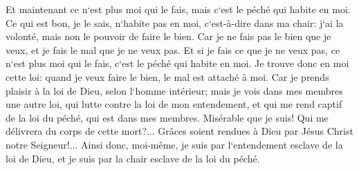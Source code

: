 \verse Et maintenant ce n`est plus moi qui le fais, mais c`est le péché qui habite en moi. 
\verse Ce qui est bon, je le sais, n`habite pas en moi, c`est-à-dire dans ma chair: j`ai la volonté, mais non le pouvoir de faire le bien. 
\verse Car je ne fais pas le bien que je veux, et je fais le mal que je ne veux pas. 
\verse Et si je fais ce que je ne veux pas, ce n`est plus moi qui le fais, c`est le péché qui habite en moi. 
\verse Je trouve donc en moi cette loi: quand je veux faire le bien, le mal est attaché à moi. 
\verse Car je prends plaisir à la loi de Dieu, selon l`homme intérieur; 
\verse mais je vois dans mes membres une autre loi, qui lutte contre la loi de mon entendement, et qui me rend captif de la loi du péché, qui est dans mes membres. 
\verse Misérable que je suis! Qui me délivrera du corps de cette mort?... 
\verse Grâces soient rendues à Dieu par Jésus Christ notre Seigneur!... Ainsi donc, moi-même, je suis par l`entendement esclave de la loi de Dieu, et je suis par la chair esclave de la loi du péché. 

